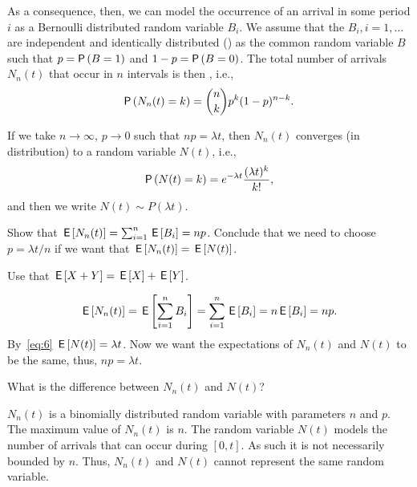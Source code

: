 As a consequence, then, we can model the occurrence of an arrival in some period $i$ as a Bernoulli distributed random variable $B_i$. We assume that the $B_i, i=1,\ldots$ are independent and identically distributed () as the common random variable $B$ such that  $p=\P{B =1}$ and $1-p = \P{B=0}$. 
The total number of arrivals $N_n(t)$ that occur in $n$ intervals is then , i.e.,
\begin{equation}\label{eq:bin}
 \P{N_n(t) = k} = {n \choose k} p^k (1-p)^{n-k}.
\end{equation}

If we take $n\to\infty$, $p\to0$ such that $n p=\lambda t$, then $N_n(t)$ converges (in distribution) to a  random variable $N(t)$, i.e., 
\begin{equation}\label{eq:pois}
 \P{N(t) = k} = 
e^{-\lambda t} \frac{(\lambda t)^k}{k!}, 
\end{equation}
and then we write $N(t)\sim P(\lambda t)$.


\begin{extra}
Show that $\,\mathsf{E}\left[N_n(t)\right] = \sum_{i=1}^n \,\mathsf{E}\left[B_i\right] = n p$. Conclude that we need to choose $p = \lambda t/n$ if we want that $\,\mathsf{E}\left[N_n(t)\right] = \,\mathsf{E}\left[N(t)\right]$.
\begin{hint}
Use that $\,\mathsf{E}\left[X+Y\right] = \,\mathsf{E}\left[X\right] + \,\mathsf{E}\left[Y\right]$. 
\end{hint}
\begin{solution}
 \begin{equation*}
 \,\mathsf{E}\left[N_n(t)\right] = \,\mathsf{E}\left[\sum_{i=1}^n {B_i}\right] = \sum_{i=1}^n \,\mathsf{E}\left[B_i\right] = n \,\mathsf{E}\left[B_i\right] = n p.
 \end{equation*}
 By~\cref{eq:6} $\,\mathsf{E}\left[N(t)\right] = \lambda t$. Now we want the expectations of $N_n(t)$ and $N(t)$ to be the same, thus, $n p = \lambda t$. 
\end{solution}
\end{extra}

\begin{extra}
What is the difference between $N_n(t)$ and $N(t)$?
\begin{solution}
 $N_n(t)$ is a binomially distributed random variable with parameters $n$ and $p$.
 The maximum value of $N_n(t)$ is $n$.
 The random variable $N(t)$ models the number of arrivals that can occur during $[0,t]$.
 As such it is not necessarily bounded by $n$.
 Thus, $N_n(t)$ and $N(t)$ cannot represent the same random variable.
\end{solution}
\end{extra}

